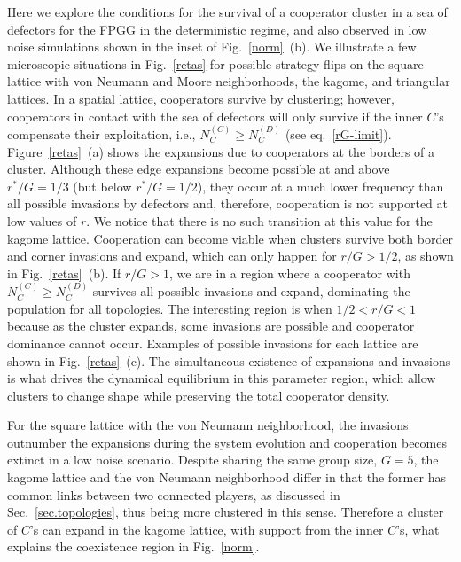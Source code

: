 \documentclass[5p,review]{elsarticle}
\begin{document}
Here we explore the conditions for the survival of a cooperator cluster in a sea of defectors for the FPGG in the deterministic regime, and also observed in low noise simulations shown in the inset of Fig.~\ref{norm}~(b).
%
We illustrate a few microscopic situations in Fig.~\ref{retas} for possible strategy flips on the square lattice with von Neumann and Moore neighborhoods, the kagome, and triangular lattices.
%
In a spatial lattice, cooperators survive by clustering; however, cooperators in contact with the sea of defectors will only survive if the inner $C$'s compensate their exploitation, i.e., $N^{{\scriptscriptstyle(C)}}_C \geqslant N^{{\scriptscriptstyle(D)}}_C$ (see eq.~\ref{rG-limit}). 
%
Figure~\ref{retas}~(a) shows the expansions due to cooperators at the borders of a cluster. Although these edge expansions become possible at and above $r^*/G=1/3$ (but below $r^*/G=1/2$), they occur at a much lower frequency than all possible invasions by defectors and, therefore, cooperation is not supported at low values of $r$. We notice that there is no such transition at this value for the kagome lattice. 
%
Cooperation can become viable when clusters survive both border and corner invasions and expand, which can only happen for $r/G>1/2$, as shown in Fig.~\ref{retas}~(b). 
If $r/G>1$, we are in a region where a cooperator with $N^{{\scriptscriptstyle(C)}}_C \geqslant N^{{\scriptscriptstyle(D)}}_C$  survives all possible invasions and expand, dominating the population for all topologies.
%
The interesting region is when $1/2 < r/G<1$ because as the cluster expands, some invasions are possible and cooperator dominance cannot occur. Examples of possible invasions for each lattice are shown in Fig.~\ref{retas}~(c).
%
The simultaneous existence of expansions and invasions is what drives the dynamical equilibrium in this parameter region, which allow clusters to change shape while preserving the total cooperator density.


For the square lattice with the von Neumann neighborhood, the invasions outnumber the expansions during the system evolution and cooperation becomes extinct in a low noise scenario.  Despite sharing the same group size, $G=5$, the kagome lattice and the von Neumann neighborhood differ in that the former has common links between two connected players, as discussed in Sec.~\ref{sec.topologies}, thus being more clustered in this sense.
%
Therefore a cluster of $C$'s can expand in the kagome lattice, with support from the inner $C$'s, what   
 explains the coexistence region in Fig.~\ref{norm}.
%
\end{document}
